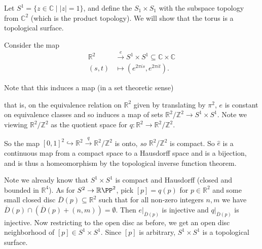 \documentclass[a4paper]{scrartcl}
\begin{document}
\begin{example}[Torus]
    Let $S^1 = \{z \in \mathbb{C} \mid |z| = 1\}$, and define the  $S_1 \times S_1$ with the subspace topology from $\mathbb{C}^2$ (which is the product topology). We will show that the torus is a topological surface.

    Consider the map
    \begin{align*}
        \mathbb{R}^2 &\xrightarrow{\ e\ } S^1 \times S^1 \subseteq \mathbb{C} \times \mathbb{C} \\
        (s, t) & \longmapsto (e^{2\pi i s}, e^{2 \pi i t}).
    \end{align*}

    Note that this induces a map (in a set theoretic sense)
    \begin{center}
    \end{center}
    that is, on the equivalence relation on $\mathbb{R}^2$ given by translating by $\pi^2$, $e$ is constant on equivalence classes and so induces a map of sets $\mathbb{R}^2/\mathbb{Z}^2 \rightarrow S^1 \times S^1$. Note we viewing $\mathbb{R}^2/\mathbb{Z}^2$ as the quotient space for $q: \mathbb{R}^2 \rightarrow \mathbb{R}^2/\mathbb{Z}^2$.

    So the map $[0, 1]^2 \hookrightarrow \mathbb{R}^2 \xrightarrow{q} \mathbb{R}^2/\mathbb{Z}^2$ is onto, \emph{so} $\mathbb{R}^2/\mathbb{Z}^2$ is compact. So $\hat{e}$ is a continuous map from a compact space to a Hausdorff space and is a bijection, and is thus a homeomorphism by the topological inverse function theorem.

    Note we already know that $S^1 \times S^1$ is compact and Hausdorff (closed and bounded in $\mathbb{R}^4$). As for $S^2 \rightarrow \mathbb{R}\PP^2$, pick $[p] = q(p)$ for $p \in \mathbb{R}^2$ and some small closed disc $\overline{D}(p) \subseteq \mathbb{R}^2$ such that for all non-zero integers $n, m$ we have $\overline{D}(p) \cap (\overline{D}(p) + (n, m)) = \emptyset$.
    Then $e|_{\overline{D}(p)}$ is injective and $q|_{\overline{D}(p)}$ is injective.
    Now restricting to the open disc as before, we get an open disc neighborhood of $[p] \in S^1 \times S^1$.
    Since $[p]$ is arbitrary, $S^1 \times S^1$ is a topological surface.


\end{example}
\end{document}
